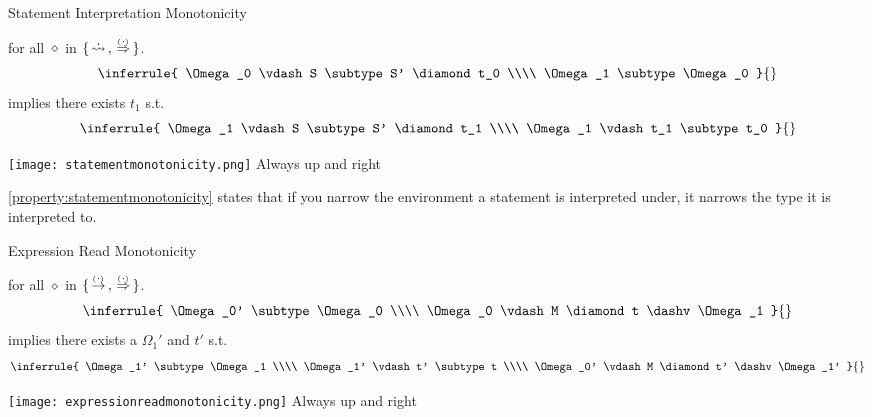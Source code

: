 \documentclass[12pt,twoside]{report}
\begin{document}
\begin{Property}{Statement Interpretation Monotonicity}{}
  \begin{minipage}{0.6\textwidth}
    \centering
    for all $\diamond$ in $\{ \,\dot{\rightsquigarrow}\,, \,\stackrel{_(._)}{\Rightarrow}\, \}$.
    \[\inferrule{
      \Omega_0 \vdash S \subtype S' \diamond t_0 \\\\
      \Omega_1 \subtype \Omega_0
    }{}\]
    implies there exists $t_1$ s.t.
    \[\inferrule{
      \Omega_1 \vdash S \subtype S' \diamond t_1 \\\\
      \Omega_1 \vdash t_1 \subtype t_0
    }{}\]
  \end{minipage}
  \begin{minipage}{0.3\textwidth}
    \centering
    \texttt{[image: statementmonotonicity.png]}
    Always up and right
  \end{minipage}
\end{Property}
\label{property:statementmonotonicity}

\ref{property:statementmonotonicity} states that if you narrow the environment a statement is interpreted under, it narrows the type it is interpreted to.

\begin{Property}{Expression Read Monotonicity}{}
  \begin{minipage}{0.6\textwidth}
    \centering
    for all $\diamond$ in $\{  \,\stackrel{_(._)}{\rightarrow}\,, \,\stackrel{_(._)}{\Rightarrow}\,  \}$.
    \[\inferrule{
      \Omega_0' \subtype \Omega_0 \\\\
      \Omega_0 \vdash M \diamond t \dashv \Omega_1
    }{}\]
    implies there exists a $\Omega_1'$ and $t'$ s.t.
    \[\inferrule{
      \Omega_1' \subtype \Omega_1 \\\\
      \Omega_1' \vdash t' \subtype t \\\\
      \Omega_0' \vdash M \diamond t' \dashv \Omega_1' 
    }{}\]
  \end{minipage}
  \begin{minipage}{0.3\textwidth}
    \centering
    \texttt{[image: expressionreadmonotonicity.png]}
    Always up and right
  \end{minipage}
  \label{property:expressionreadmonotonicity}
\end{Property}
\end{document}
